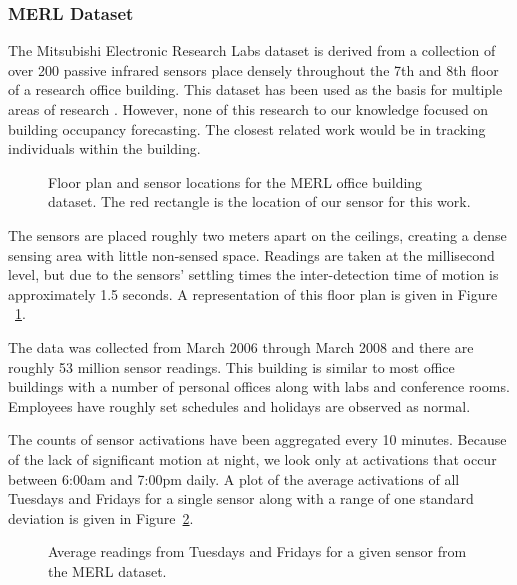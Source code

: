 \subsubsection{MERL Dataset} 
The Mitsubishi Electronic Research Labs dataset is derived from a collection of over 200 passive infrared sensors place densely throughout the 7th and 8th floor of a research office building.  This dataset has been used as the basis for multiple areas of research \cite{Wren2003, Wren2006, Wren2007a, Dong2011, Minnen2004, Wren2006a, Wren2007}.  However, none of this research to our knowledge focused on building occupancy forecasting.  The closest related work would be in tracking individuals within the building.

\begin{figure}[!ht]
	\begin{center}
	\end{center}
	\caption{Floor plan and sensor locations for the MERL office building dataset.  The red rectangle is the location of our sensor for this work.}
	\label{fig:merlfloor}
\end{figure}

The sensors are placed roughly two meters apart on the ceilings, creating a dense sensing area with little non-sensed space.  Readings are taken at the millisecond level, but due to the sensors' settling times the inter-detection time of motion is approximately 1.5 seconds.  A representation of this floor plan is given in Figure ~\ref{fig:merlfloor}.

The data was collected from March 2006 through March 2008 and there are roughly 53 million sensor readings.  This building is similar to most office buildings with a number of personal offices along with labs and conference rooms.  Employees have roughly set schedules and holidays are observed as normal. 

The counts of sensor activations have been aggregated every 10 minutes.  Because of the lack of significant motion at night, we look only at activations that occur between 6:00am and 7:00pm daily.  A plot of the average activations of all Tuesdays and Fridays for a single sensor along with a range of one standard deviation is given in Figure~\ref{fig:merl_day_raw}.  

\begin{figure}[!ht]
	\begin{center}
	\end{center}
	\caption{Average readings from Tuesdays and Fridays for a given sensor from the MERL dataset.}
	\label{fig:merl_day_raw}
\end{figure}

